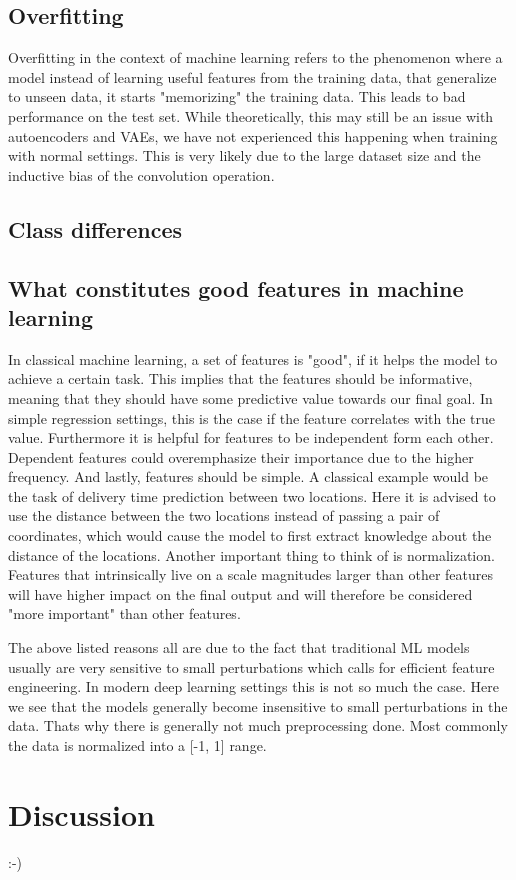 \documentclass[10pt,a4paper,twoside]{article}
\begin{document}
\subsection{Overfitting}

Overfitting in the context of machine learning refers to the phenomenon where
a model instead of learning useful features from the training data, that
generalize to unseen data, it starts "memorizing" the training data. This
leads to bad performance on the test set. While theoretically, this may still
be an issue with autoencoders and VAEs, we have not experienced this happening
when training with normal settings. This is very likely due to the large
dataset size and the inductive bias of the convolution operation.

\subsection{Class differences}

\subsection{What constitutes good features in machine learning}

In classical machine learning, a set of features is "good", if it helps the
model to achieve a certain task. This implies that the features should be
informative, meaning that they should have some predictive value towards our
final goal. In simple regression settings, this is the case if the feature
correlates with the true value. Furthermore it is helpful for features to be
independent form each other. Dependent features could overemphasize their
importance due to the higher frequency. And lastly, features should be simple.
A classical example would be the task of delivery time prediction between two
locations. Here it is advised to use the distance between the two locations
instead of passing a pair of coordinates, which would cause the model to first
extract knowledge about the distance of the locations. Another important thing
to think of is normalization. Features that intrinsically live on a scale
magnitudes larger than other features will have higher impact on the final
output and will therefore be considered "more important" than other features. 

The above listed reasons all are due to the fact that traditional ML models
usually are very sensitive to small perturbations which calls for efficient
feature engineering. In modern deep learning settings this is not so much the
case. Here we see that the models generally become insensitive to small
perturbations in the data. Thats why there is generally not much preprocessing
done. Most commonly the data is normalized into a [-1, 1] range.

\section{Discussion}
:-)


\end{document}
